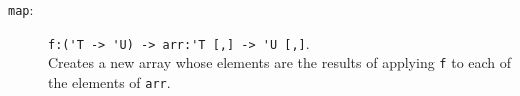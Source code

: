 \documentclass[fsharpNotes.tex]{subfiles}
\begin{document}
\begin{description}
\item[\texttt{map}:] \lstinline{f:('T -> 'U) -> arr:'T [,] -> 'U [,]}.~\\
  Creates a new array whose elements are the results of applying \lstinline{f} to each of the elements of \lstinline{arr}.
\end{description}
\end{document}
